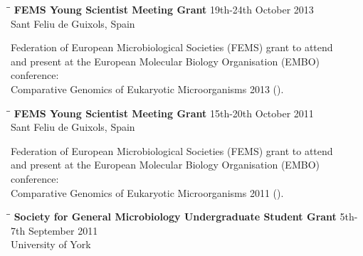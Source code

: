 \documentclass{res}
\begin{document}
\begin{resume}
   \vspace{-0.1in}  
   
   \begin{tabbing}
   \hspace{2in}\= \hspace{2.6in}\= \kill 
    {\bf FEMS Young Scientist Meeting Grant} \> \> 19th-24th October 2013\\
                            \>  
                            \> Sant Feliu de Guixols, Spain \\
                       
   \end{tabbing}\vspace{-30pt}      

   Federation of European Microbiological Societies (FEMS) grant to attend\\ and present at the European Molecular Biology Organisation (EMBO) conference:\\ Comparative Genomics of Eukaryotic Microorganisms 2013 ().

 
 \vspace{-0.1in}  
   \begin{tabbing}
   \hspace{2in}\= \hspace{2.6in}\= \kill 
    {\bf FEMS Young Scientist Meeting Grant} \> \> 15th-20th October 2011\\
                            \>  
                            \> Sant Feliu de Guixols, Spain \\
                       
   \end{tabbing}\vspace{-30pt}      

   Federation of European Microbiological Societies (FEMS) grant to attend\\ and present at the European Molecular Biology Organisation (EMBO) conference: \\ Comparative Genomics of Eukaryotic Microorganisms 2011 ().

 
\vspace{-0.1in}  
   \begin{tabbing}
   \hspace{2in}\= \hspace{2.6in}\= \kill
    {\bf Society for General Microbiology Undergraduate Student Grant} \> \> 5th-7th September 2011\\
                            \> 
                            \> University of York \\


\end{tabbing}
\end{resume}
\end{document}
